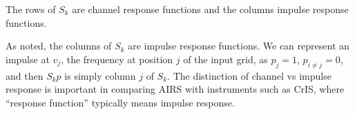 
The rows of $S_k$ are channel response functions and the columns
impulse response functions.

As noted, the columns of $S_k$ are impulse response functions.  
We can represent an impulse at $v_j$, the frequency at position $j$
of the input grid, as $p_j=1$, $p_{i\ne j}=0$, and then $S_k p$ is
simply column $j$ of $S_k$.  The distinction of channel vs impulse
response is important in comparing AIRS with instruments such as
CrIS, where ``response function'' typically means impulse response.
